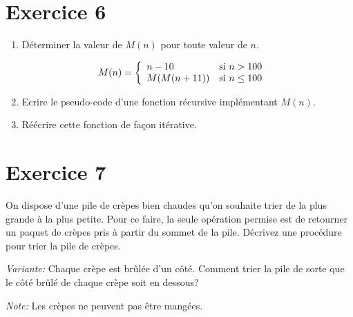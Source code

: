 \documentclass[a4paper,10pt]{article}
\begin{document}
\section*{Exercice 6}

\begin{enumerate}

\item Déterminer la valeur de $M(n)$ pour toute valeur de $n$.

\begin{align*}
M(n) &= \left\{
    \begin{array}{l l}
        n - 10 & \text{si } n > 100 \\
        M(M(n+11)) & \text{si } n \leq 100\\
    \end{array} \right.
\end{align*}

\item Ecrire le pseudo-code d'une fonction récursive implémentant $M(n)$.
\item Réécrire cette fonction de façon itérative.

\end{enumerate}

\section*{Exercice 7}

On dispose d'une pile de crèpes bien chaudes qu'on souhaite trier de la plus
grande à la plus petite. Pour ce faire, la seule opération permise est
de retourner un paquet de crèpes pris à partir du sommet de la pile.
Décrivez une procédure pour trier la pile de crèpes.

\textit{Variante:} Chaque crèpe est brûlée d'un côté. Comment trier la pile de sorte
que le côté brûlé de chaque crèpe soit en dessous?

\textit{Note:} Les crèpes ne peuvent pas être mangées.
\end{document}
